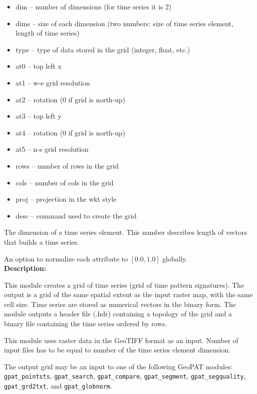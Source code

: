 \begin{itemize}
	\item dim -- number of dimensions (for time series it is 2)
	\item dims -- size of each dimension (two numbers: size of time series element, length of time series)
	\item type -- type of data stored in the grid (integer, float, etc.)
	\item at0 -- top left x
	\item at1 -- w-e grid resolution
	\item at2 -- rotation (0 if grid is north-up)
	\item at3 -- top left y
	\item at4 -- rotation (0 if grid is north-up)
	\item at5 -- n-s grid resolution
	\item rows -- number of rows in the grid
	\item cols -- number of cols in the grid
	\item proj -- projection in the wkt style
	\item desc -- command used to create the grid
\end{itemize}


The dimension of a time series element. 
This number describes length of vectors that builds a time series.


An option to normalize each attribute to $[0.0, 1.0]$ globally.\\

{\bf Description:}

This module creates a grid of time series (grid of time pattern signatures).
The output is a grid of the same spatial extent as the input raster map, with the same cell size.
Time series are stored as numerical vectors in the binary form.
The module outputs a header file (.hdr) containing a topology of the grid and a binary file containing the time series ordered by rows.

This module uses raster data in the GeoTIFF format as an input. 
Number of input files has to be equal to number of the time series element dimension.

The output grid may be an input to one of the following GeoPAT modules: {\tt gpat\_pointsts}, {\tt gpat\_search}, {\tt gpat\_compare}, {\tt gpat\_segment}, {\tt gpat\_segquality}, {\tt gpat\_grd2txt}, and {\tt gpat\_globnorm}.

